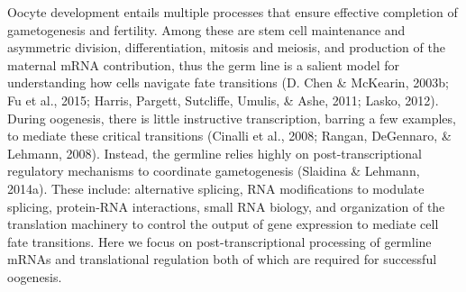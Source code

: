 \documentclass[12pt,oneside]{reedthesis}
\begin{document}
Oocyte development entails multiple processes that ensure effective
completion of gametogenesis and fertility. Among these are stem cell
maintenance and asymmetric division, differentiation, mitosis and
meiosis, and production of the maternal mRNA contribution, thus the germ
line is a salient model for understanding how cells navigate fate
transitions (D. Chen \& McKearin, 2003b; Fu et al., 2015; Harris, Pargett, Sutcliffe, Umulis, \& Ashe, 2011; Lasko, 2012).
During oogenesis, there is little instructive transcription, barring a
few examples, to mediate these critical transitions (Cinalli et al., 2008; Rangan, DeGennaro, \& Lehmann, 2008). Instead, the germline relies highly on
post-transcriptional regulatory mechanisms to coordinate gametogenesis
(Slaidina \& Lehmann, 2014a). These include: alternative splicing, RNA
modifications to modulate splicing, protein-RNA interactions, small RNA
biology, and organization of the translation machinery to control the
output of gene expression to mediate cell fate transitions. Here we
focus on post-transcriptional processing of germline mRNAs and
translational regulation both of which are required for successful
oogenesis.
\end{document}
